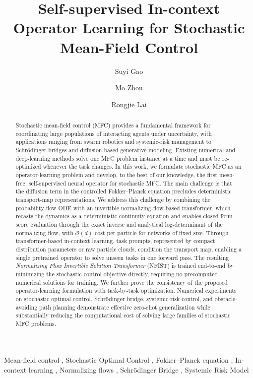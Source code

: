 \documentclass[preprint]{elsarticle}
\date{}
\begin{document}
\begin{frontmatter}

\title{\textbf{Self-supervised In-context Operator Learning
       for Stochastic Mean-Field Control}}

\author[aff1]{Suyi Gao}
\author[aff2]{Mo Zhou}
\author[aff1]{Rongjie Lai}
\address[aff1]{Department of Mathematics, Purdue University, West Lafayette, USA}
\address[aff2]{Department of Mathematics, University of California, Los Angeles, USA}

\begin{abstract}
Stochastic mean-field control (MFC) provides a fundamental framework for coordinating large populations of interacting agents under uncertainty, with applications ranging from swarm robotics and systemic-risk management to Schr\"odinger bridges and diffusion-based generative modeling. Existing numerical and deep-learning methods solve one MFC problem instance at a time and must be re-optimized whenever the task changes. In this work, we formulate stochastic MFC as an operator-learning problem and develop, to the best of our knowledge, the first mesh-free, self-supervised neural operator for stochastic MFC. The main challenge is that the diffusion term in the controlled Fokker--Planck equation precludes deterministic transport-map representations. We address this challenge by combining the probability-flow ODE with an invertible normalizing-flow-based transformer, which recasts the dynamics as a deterministic continuity equation and enables closed-form score evaluation through the exact inverse and analytical log-determinant of the normalizing flow, with $\mathcal{O}(d)$ cost per particle for networks of fixed size. Through transformer-based in-context learning, task prompts, represented by compact distribution parameters or raw particle clouds, condition the transport map, enabling a single pretrained operator to solve unseen tasks in one forward pass. The resulting \emph{Normalizing Flow Invertible Solution Transformer} (NFIST) is trained end-to-end by minimizing the stochastic control objective directly, requiring no precomputed numerical solutions for training. We further prove the consistency of the proposed operator-learning formulation with task-by-task optimization. Numerical experiments on stochastic optimal control, Schr\"odinger bridge, systemic-risk control, and obstacle-avoiding path planning demonstrate effective zero-shot generalization while substantially reducing the computational cost of solving large families of stochastic MFC problems.
\end{abstract}

\begin{keyword}
Mean-field control \sep
Stochastic Optimal Control \sep
Fokker--Planck equation \sep
In-context learning \sep
Normalizing flows \sep
Schr\"odinger Bridge \sep
Systemic Risk Model
\end{keyword}

\end{frontmatter}
\end{document}
